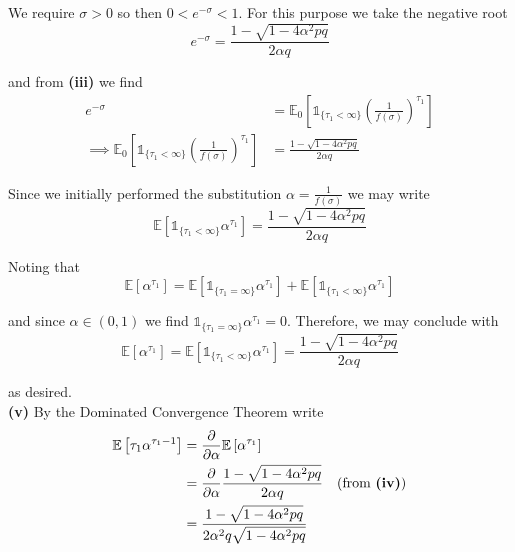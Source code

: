 \documentclass[12pt]{article}
\newcommand{\E}{\mathbb E}
\begin{document}
We require $\sigma > 0$ so then $0 < e^{-\sigma} < 1$. For this purpose we take the negative root
\begin{equation*}
	e^{-\sigma} = \frac{ 1 - \sqrt{1 - 4\alpha^2 pq}}{ 2\alpha q } 
\end{equation*}

and from {\bf (iii)} we find
\begin{align*}
	e^{-\sigma} &= \E_0 \left[ \mathds 1_{\{ \tau_1 < \infty \}} \left( \frac{1}{f(\sigma)} \right)^{\tau_1} \right] \\
	\implies \E_0 \left[ \mathds 1_{\{ \tau_1 < \infty \}} \left( \frac{1}{f(\sigma)} \right)^{\tau_1} \right] &= \frac{ 1 - \sqrt{1 - 4\alpha^2 pq} }{ 2\alpha q } 
\end{align*}

Since we initially performed the substitution $\alpha = \frac{1}{f(\sigma)}$ we may write
\begin{equation*}
	\E \left[ \mathds 1_{\{\tau_1 < \infty \}} \alpha^{\tau_1} \right] = \frac{ 1 - \sqrt{1 - 4\alpha^2 pq } }{ 2\alpha q } 
\end{equation*}

Noting that
\begin{equation*}
	\E \left[\alpha^{\tau_1} \right] = \E \left[ \mathds 1_{\{\tau_1 = \infty \}} \alpha^{\tau_1} \right] + \E \left[ \mathds 1_{\{\tau_1 < \infty \}} \alpha^{\tau_1} \right] 
\end{equation*}

and since $\alpha \in (0,1)$ we find $\mathds 1_{\{\tau_1 = \infty \}} \alpha^{\tau_1} = 0$. Therefore, we may conclude with
\begin{equation*}
	\E \left[ \alpha^{\tau_1} \right] = \E \left[ \mathds 1_{\{\tau_1 < \infty \}} \alpha^{\tau_1} \right] = \frac{ 1 - \sqrt{1 - 4\alpha^2 pq } }{ 2\alpha q } 
\end{equation*}


as desired. \\

{\bf (v)} By the Dominated Convergence Theorem write
\begin{align*}
	\E \left[ \tau_1 \alpha^{\tau_1 - 1} \right] &= \frac{ \partial }{ \partial \alpha } \E \left[ \alpha^{\tau_1} \right] \\
	&= \frac{ \partial }{ \partial \alpha }  \frac{ 1 - \sqrt{1 - 4\alpha^2 pq } }{ 2\alpha q }  \quad \text{(from {\bf (iv)})} \\
	&= \frac{ 1 - \sqrt{1 - 4\alpha^2 pq} }{ 2\alpha^2 q \sqrt{1 - 4\alpha^2 pq} }
\end{align*}
\end{document}
